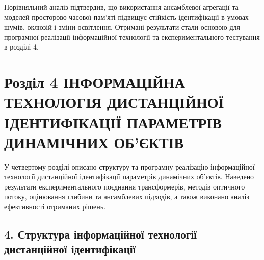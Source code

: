 \documentclass[
]{article}
\begin{document}
Порівняльний аналіз підтвердив, що використання ансамблевої агрегації та моделей просторово-часової пам'яті підвищує стійкість ідентифікації в умовах шумів, оклюзій і зміни освітлення. Отримані результати стали основою для програмної реалізації інформаційної технології та експериментального тестування в розділі 4.

\section{\texorpdfstring{Розділ 4 ІНФОРМАЦІЙНА ТЕХНОЛОГІЯ ДИСТАНЦІЙНОЇ ІДЕНТИФІКАЦІЇ ПАРАМЕТРІВ ДИНАМІЧНИХ ОБ'ЄКТІВ\\
}{Розділ 4 ІНФОРМАЦІЙНА ТЕХНОЛОГІЯ ДИСТАНЦІЙНОЇ ІДЕНТИФІКАЦІЇ ПАРАМЕТРІВ ДИНАМІЧНИХ ОБ'ЄКТІВ }}\label{ux440ux43eux437ux434ux456ux43b-4-ux456ux43dux444ux43eux440ux43cux430ux446ux456ux439ux43dux430-ux442ux435ux445ux43dux43eux43bux43eux433ux456ux44f-ux434ux438ux441ux442ux430ux43dux446ux456ux439ux43dux43eux457-ux456ux434ux435ux43dux442ux438ux444ux456ux43aux430ux446ux456ux457-ux43fux430ux440ux430ux43cux435ux442ux440ux456ux432-ux434ux438ux43dux430ux43cux456ux447ux43dux438ux445-ux43eux431ux454ux43aux442ux456ux432}

У четвертому розділі описано структуру та програмну реалізацію інформаційної технології дистанційної ідентифікації параметрів динамічних об'єктів. Наведено результати експериментального поєднання трансформерів, методів оптичного потоку, оцінювання глибини та ансамблевих підходів, а також виконано аналіз ефективності отриманих рішень.

\subsection{4. Структура інформаційної технології дистанційної ідентифікації}\label{ux441ux442ux440ux443ux43aux442ux443ux440ux430-ux456ux43dux444ux43eux440ux43cux430ux446ux456ux439ux43dux43eux457-ux442ux435ux445ux43dux43eux43bux43eux433ux456ux457-ux434ux438ux441ux442ux430ux43dux446ux456ux439ux43dux43eux457-ux456ux434ux435ux43dux442ux438ux444ux456ux43aux430ux446ux456ux457}
\end{document}
